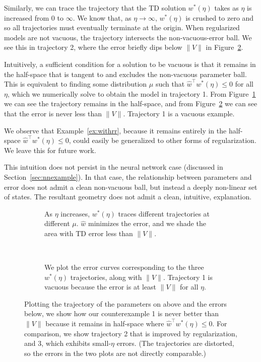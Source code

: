 Similarly, we can trace the trajectory that the TD solution $w^*(\eta)$ takes as $\eta$ is increased from 0 to $\infty$. We know that, as $\eta\to\infty$, $w^*(\eta)$ is crushed to zero and so all trajectories must eventually terminate at the origin. When regularized models are not vacuous, the trajectory intersects the non-vacuous-error ball. We see this in trajectory 2, where the error briefly dips below $\|V\|$ in Figure~\ref{fig:giplots}.

Intuitively, a sufficient condition for a solution to be vacuous is that it remains in the half-space that is tangent to and excludes the non-vacuous parameter ball. This is equivalent to finding some distribution $\mu$ such that $\hat w^\top w^*(\eta) \leq 0$ for all $\eta$, which we numerically solve to obtain the model in trajectory 1. From Figure~\ref{fig:gigeometry} we can see the trajectory remains in the half-space, and from Figure~\ref{fig:giplots} we can see that the error is never less than $\|V\|$. Trajectory 1 is a vacuous example. 

We observe that Example~\ref*{ex:withrr}, because it remains entirely in the half-space $\hat w^\top w^*(\eta) \leq 0$, could easily be generalized to other forms of regularization. We leave this for future work.

This intuition does not persist in the neural network case (discussed in Section~\ref{sec:nnexample}). In that case, the relationship between parameters and error does not admit a clean non-vacuous ball, but instead a deeply non-linear set of states. The resultant geometry does not admit a clean, intuitive, explanation.

\begin{figure} \centering
  \begin{subfigure}[t]{0.8\textwidth}
    \centering
    
    \caption{As $\eta$ increases, $w^*(\eta)$ traces different trajectories at different $\mu$. $\hat w$ minimizes the error, and we shade the area with TD error less than $\|V\|$. }
    \label{fig:gigeometry}
  \end{subfigure}
  \\
  \begin{subfigure}[t]{0.8\textwidth}
    \centering
    
    \caption{We plot the error curves corresponding to the three $w^*(\eta)$ trajectories, along with $\|V\|$. Trajectory 1 is vacuous because the error is at least $\|V\|$ for all $\eta$. }
    \label{fig:giplots}
  \end{subfigure}
  \caption{Plotting the trajectory of the parameters on above and the errors below, we show how our counterexample 1 is never better than $\|V\|$ because it remains in half-space where $\hat w^\top w^*(\eta) \leq 0$. For comparison, we show trajectory 2 that is improved by regularization, and 3, which exhibits small-$\eta$ errors. (The trajectories are distorted, so the errors in the two plots are not directly comparable.) }
  \label{fig:gi}
\end{figure}

